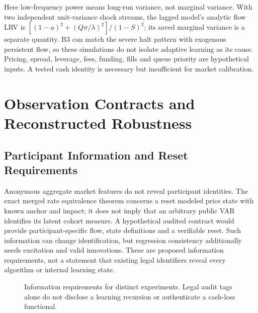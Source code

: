 \documentclass[12pt]{article}
\theoremstyle{definition}
\theoremstyle{remark}
\begin{document}
Here low-frequency power means long-run variance, not marginal variance. With two independent unit-variance shock streams, the lagged model's analytic flow LRV is $[(1-a)^2+(Q\sigma/\lambda)^2]/(1-S)^2$; its saved marginal variance is a separate quantity. B3 can match the severe halt pattern with exogenous persistent flow, so these simulations do not isolate adaptive learning as its cause. Pricing, spread, leverage, fees, funding, fills and queue priority are hypothetical inputs. A tested cash identity is necessary but insufficient for market calibration.

\section{Observation Contracts and Reconstructed Robustness}
\label{sec:surveillance}
\subsection{Participant Information and Reset Requirements}
Anonymous aggregate market features do not reveal participant identities. The exact merged rate equivalence theorem concerns a reset modeled price state with known anchor and impact; it does not imply that an arbitrary public VAR identifies its latent cohort measure. A hypothetical audited contract would provide participant-specific flow, state definitions and a verifiable reset. Such information can change identification, but regression consistency additionally needs excitation and valid innovations. These are proposed information requirements, not a statement that existing legal identifiers reveal every algorithm or internal learning state.

\begin{figure}[htbp]\centering
{}
\caption{Information requirements for distinct experiments. Legal audit tags alone do not disclose a learning recursion or authenticate a cash-loss functional.}
\label{fig:surveillance_contracts}\end{figure}
\end{document}

